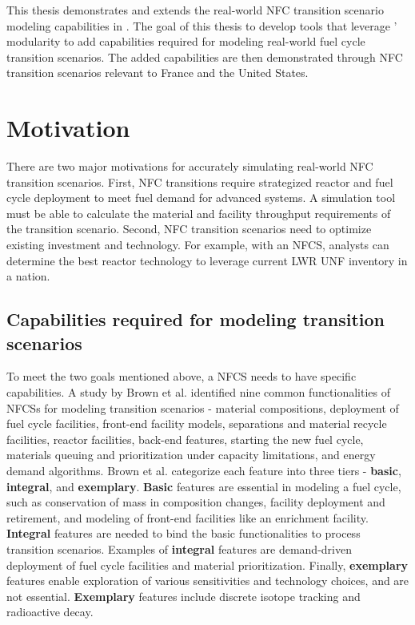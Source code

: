 This thesis demonstrates and extends the real-world \gls{NFC} transition
scenario modeling capabilities in \Cyclus. 
The goal of this thesis to
develop tools that leverage \Cyclus' modularity to
add capabilities required for modeling real-world
fuel cycle transition scenarios. The added capabilities are then
demonstrated through \gls{NFC} transition scenarios relevant to France and the United
States.

\section{Motivation}

There are two major motivations for accurately simulating
real-world \gls{NFC} transition scenarios.
First, \gls{NFC} transitions require strategized reactor
and fuel cycle deployment to meet fuel demand for advanced systems.
A simulation tool must be able to calculate the material
and facility throughput requirements of the transition scenario.
Second, \gls{NFC} transition scenarios need to optimize
existing investment and technology. For example, with an \gls{NFCS},
analysts can determine the best reactor technology
to leverage current \gls{LWR} \gls{UNF} inventory in a nation.


\subsection{Capabilities required for modeling transition scenarios}
To meet the two goals mentioned above, a \gls{NFCS} needs to have
specific capabilities.
A study by Brown et al. \cite{brown_identification_2016}
identified nine common functionalities of \glspl{NFCS} for modeling
transition scenarios - material compositions, deployment of fuel
cycle facilities, front-end facility models, separations and material
recycle facilities, reactor facilities, back-end features, starting
the new fuel cycle, materials queuing and prioritization under
capacity limitations, and energy demand algorithms. Brown et al.
categorize each feature into three tiers - \textbf{basic}, \textbf{integral},
and \textbf{exemplary}. \textbf{Basic} features are essential in modeling a fuel
cycle, such as conservation of mass in composition changes,
facility deployment and retirement, and modeling of front-end
facilities like an enrichment facility.
\textbf{Integral} features are
needed to bind the basic functionalities to process
transition scenarios. Examples of \textbf{integral} features are
demand-driven deployment of fuel cycle facilities and
material prioritization.
Finally, \textbf{exemplary} features enable exploration
of various sensitivities and technology choices, and are
not essential. \textbf{Exemplary} features include discrete isotope
tracking and radioactive decay.


